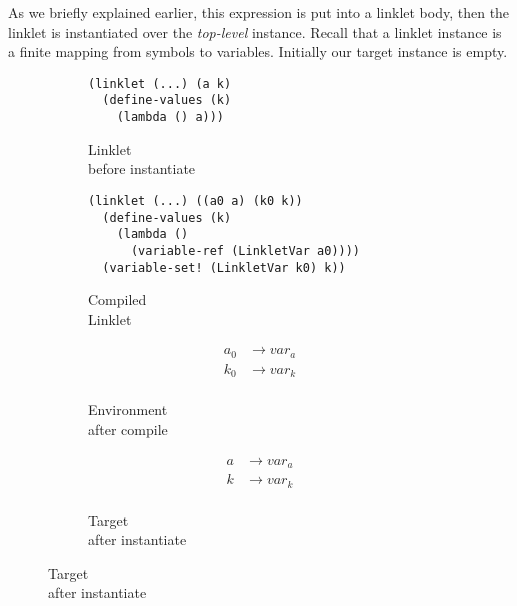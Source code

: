 As we briefly explained earlier, this expression is put into a linklet
body, then the linklet is instantiated over the \emph{top-level}
instance. Recall that a linklet instance is a finite mapping from
symbols to variables. Initially our target instance is empty.

\begin{figure}[h!]
  \small
  \begin{subfigure}[b]{0.25\textwidth}
    \begin{mdframed}
\begin{verbatim}
(linklet (...) (a k)
  (define-values (k)
    (lambda () a)))
\end{verbatim}
    \end{mdframed}
    \caption{Linklet \\ before instantiate}
    \label{fig:1}
  \end{subfigure}
  \begin{subfigure}[b]{0.38\textwidth}
    \begin{mdframed}
\begin{verbatim}
(linklet (...) ((a0 a) (k0 k))
  (define-values (k)
    (lambda ()
      (variable-ref (LinkletVar a0))))
  (variable-set! (LinkletVar k0) k))
\end{verbatim}
    \end{mdframed}
    \caption{Compiled \\ Linklet}
    \label{fig:2}
  \end{subfigure} \hfill
  \begin{subfigure}[b]{0.15\textwidth}
    \begin{mdframed}
      \begin{align*}
        a_0 &\rightarrow var_a \\
        k_0 &\rightarrow var_k \\
      \end{align*}
    \end{mdframed}
    \caption{Environment \\ after compile}
    \label{fig:2}
  \end{subfigure}
  \begin{subfigure}[b]{0.15\textwidth}
    \begin{mdframed}
      \begin{align*}
        a &\rightarrow var_a \\
        k &\rightarrow var_k \\
      \end{align*}
    \end{mdframed}
    \caption{Target \\ after instantiate}
    \label{fig:2}
  \end{subfigure}
\end{figure}

